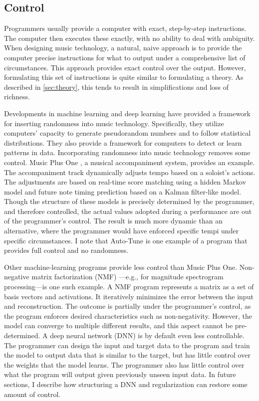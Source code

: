 \subsection{Control}
Programmers usually provide a computer with exact, step-by-step instructions. The computer then executes these exactly, with no ability to deal with ambiguity. When designing music technology, a natural, naive approach is to provide the computer precise instructions for what to output under a comprehensive list of circumstances. This approach provides exact control over the output. However, formulating this set of instructions is quite similar to formulating a theory. As described in \ref{sec:theory}, this tends to result in simplifications and loss of richness. 

Developments in machine learning and deep learning have provided a framework for inserting randomness into music technology. Specifically, they utilize computers' capacity to generate pseudorandom numbers and to follow statistical distributions. They also provide a framework for computers to detect or learn patterns in data. Incorporating randomness into music technology removes some control. Music Plus One \cite{raphael2010music}, a musical accompaniment system, provides an example. The accompaniment track dynamically adjusts tempo based on a soloist's actions. The adjustments are based on real-time score matching using a hidden Markov model and future note timing prediction based on a Kalman filter-like model. Though the structure of these models is precisely determined by the programmer, and therefore controlled, the actual values adopted during a performance are out of the programmer's control. The result is much more dynamic than an alternative, where the programmer would have enforced specific tempi under specific circumstances. I note that Auto-Tune is one example of a program that provides full control and no randomness.

Other machine-learning programs provide less control than Music Plus One. Non-negative matrix factorization (NMF) \cite{LeeDD2000nips}---e.g., for magnitude spectrogram processing---is one such example. A NMF program represents a matrix as a set of basis vectors and activations. It iteratively minimizes the error between the input and reconstruction. The outcome is partially under the programmer's control, as the program enforces desired characteristics such as non-negativity. However, the model can converge to multiple different results, and this aspect cannot be pre-determined. A deep neural network (DNN) is by default even less controllable. The programmer can design the input and target data to the program and train the model to output data that is similar to the target, but has little control over the weights that the model learns. The programmer also has little control over what the program will output given previously unseen input data. In future sections, I describe how structuring a DNN and regularization can restore some amount of control. 

